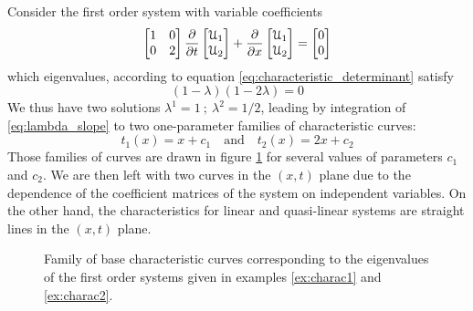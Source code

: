 \begin{example}
  \label{ex:charac2}
  Consider the first order system with variable coefficients
\begin{equation*}
 \left[\begin{matrix}1 &0 \\0 &2\end{matrix}\right] \frac{\partial }{\partial t} \left[\begin{matrix}\mathcal{U}_1 \\ \mathcal{U}_2\end{matrix}\right] + \frac{\partial }{\partial x}\left[\begin{matrix}\mathcal{U}_1 \\ \mathcal{U}_2\end{matrix}\right] = \left[\begin{matrix}0 \\0\end{matrix}\right]
\end{equation*}
which eigenvalues, according to equation \eqref{eq:characteristic_determinant} satisfy
\begin{equation*}
  (1 - \lambda )(1- 2\lambda)=0
\end{equation*}
We thus have two solutions $\lambda^1=1 \: ; \: \lambda^2=1/2$, leading by integration of \eqref{eq:lambda_slope} to two one-parameter families of characteristic curves:
\begin{equation*}
  t_1(x)=x+c_1  \quad \text{and} \quad t_2(x)=2x+c_2 
\end{equation*}
Those families of curves are drawn in figure \ref{fig:exampleCharac} for several values of parameters $c_1$ and $c_2$. We are then left with two curves in the $(x,t)$ plane due to the dependence of the coefficient matrices of the system on independent variables. On the other hand, the characteristics for linear and quasi-linear systems are straight lines in the $(x,t)$ plane.
\end{example}
\begin{figure}[h]
  \centering
  \subfloat[Example \ref{ex:charac1}: $\lambda^{1,2}=\pm 1/x$]{} \qquad
  \subfloat[Example \ref{ex:charac2}: $\lambda^{1}=1 \: \lambda^2=1/2$]{}
  \caption{Family of base characteristic curves corresponding to the eigenvalues of the first order systems given in examples \ref{ex:charac1} and \ref{ex:charac2}.}
  \label{fig:exampleCharac}
\end{figure}

